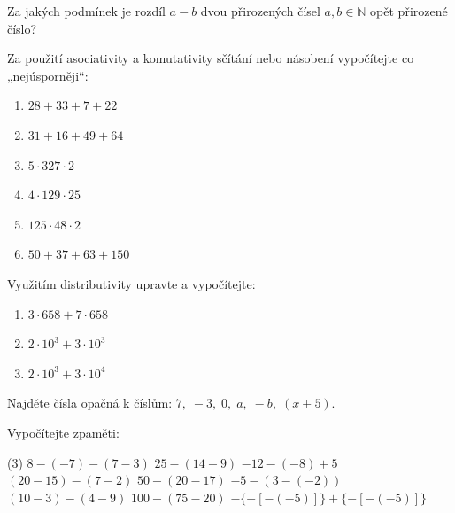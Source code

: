 \documentclass[12pt,a4paper]{article}
\begin{document}
\exercisepart

\setcounter{section}{1}
\begin{exercise}
Za jakých podmínek je rozdíl $a-b$ dvou přirozených čísel $a, b \in \mathbb{N}$ opět přirozené číslo?
\end{exercise}

\setcounter{section}{2}
\begin{exercise}
Za použití asociativity a komutativity sčítání nebo násobení vypočítejte co „nejúsporněji“:  
\begin{enumerate}[label=\alph*)]
    \item $28+33+7+22$  
    \item $31+16+49+64$  
    \item $5 \cdot 327 \cdot 2$  
    \item $4 \cdot 129 \cdot 25$  
    \item $125 \cdot 48 \cdot 2$  
    \item $50+37+63+150$  
\end{enumerate}
\end{exercise}

\begin{exercise}[Distributivita]
Využitím distributivity upravte a vypočítejte:  
\begin{enumerate}[label=\alph*)]
    \item $3 \cdot 658 + 7 \cdot 658$  
    \item $2 \cdot 10^3 + 3 \cdot 10^3$  
    \item $2 \cdot 10^3 + 3 \cdot 10^4$  
\end{enumerate}
\end{exercise}

\begin{exercise}
Najděte čísla opačná k číslům:  
$7, \; -3, \; 0, \; a, \; -b, \; (x+5)$.
\end{exercise}

\begin{exercise}
Vypočítejte zpaměti:  
\begin{tasks}(3) %
    \task $8 - (-7) - (7-3)$  
    \task $25 - (14 - 9)$  
    \task $-12 - (-8) + 5$  
    \task $(20-15) - (7-2)$  
    \task $50 - (20 - 17)$  
    \task $-5 - (3 - (-2))$  
    \task $(10-3) - (4-9)$  
    \task $100 - (75 - 20)$  
    \task $-\{-[-(-5)]\}+\{-[-(-5)]\}$
\end{tasks}
\end{exercise}
\end{document}
